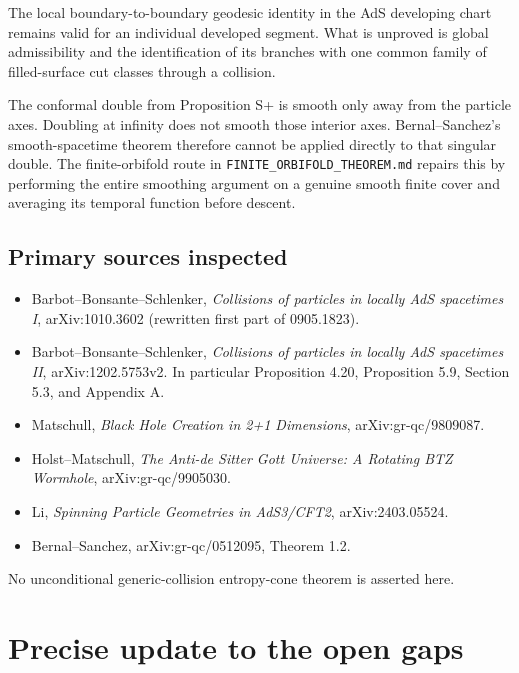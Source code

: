 \documentclass[11pt]{article}
\providecommand{\tightlist}{\setlength{\itemsep}{1pt}\setlength{\parskip}{0pt}}
\begin{document}
The local boundary-to-boundary geodesic identity in the AdS developing
chart remains valid for an individual developed segment. What is
unproved is global admissibility and the identification of its branches
with one common family of filled-surface cut classes through a
collision.

The conformal double from Proposition S+ is smooth only away from the
particle axes. Doubling at infinity does not smooth those interior axes.
Bernal--Sanchez's smooth-spacetime theorem therefore cannot be applied
directly to that singular double. The finite-orbifold route in
\texttt{FINITE\_\allowbreak ORBIFOLD\_\allowbreak THEOREM.md} repairs this by performing the
entire smoothing argument on a genuine smooth finite cover and averaging
its temporal function before descent.

\subsection{Primary sources inspected}\label{primary-sources-inspected}

\begin{itemize}
\tightlist
\item
  Barbot--Bonsante--Schlenker, \emph{Collisions of particles in locally
  AdS spacetimes I}, arXiv:1010.3602 (rewritten first part of
  0905.1823).
\item
  Barbot--Bonsante--Schlenker, \emph{Collisions of particles in locally
  AdS spacetimes II}, arXiv:1202.5753v2. In particular Proposition 4.20,
  Proposition 5.9, Section 5.3, and Appendix A.
\item
  Matschull, \emph{Black Hole Creation in 2+1 Dimensions},
  arXiv:gr-qc/9809087.
\item
  Holst--Matschull, \emph{The Anti-de Sitter Gott Universe: A Rotating
  BTZ Wormhole}, arXiv:gr-qc/9905030.
\item
  Li, \emph{Spinning Particle Geometries in AdS3/CFT2},
  arXiv:2403.05524.
\item
  Bernal--Sanchez, arXiv:gr-qc/0512095, Theorem 1.2.
\end{itemize}

No unconditional generic-collision entropy-cone theorem is asserted
here.

\clearpage

\section{Precise update to the open
gaps}\label{precise-update-to-the-open-gaps}
\end{document}
